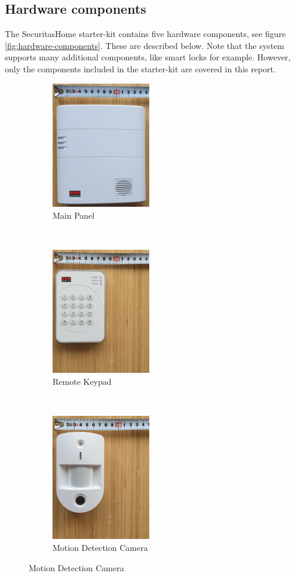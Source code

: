 \subsection{Hardware components} \label{ch:system:hardware}
The SecuritasHome starter-kit contains five hardware components, see figure \ref{fig:hardware-components}. These are described below. Note that the system supports many additional components, like smart locks for example. However, only the components included in the starter-kit are covered in this report.
\begin{figure}[!ht]
    \centering
    \begin{subfigure}[t]{0.33\textwidth}
        \includegraphics[height=2.15in]{images/main-panel.png}
        \caption{Main Panel}
        \label{fig:main-panel}
    \end{subfigure}%
    ~
    \begin{subfigure}[t]{0.33\textwidth}
        \includegraphics[height=2.15in]{images/keypad.png}
        \caption{Remote Keypad}
        \label{fig:remote-keypad}
    \end{subfigure}%
    ~
    \begin{subfigure}[t]{0.33\textwidth}
        \includegraphics[height=2.15in]{images/camera.png}
        \caption{Motion Detection Camera}
        \label{fig:motion-camera}
    \end{subfigure}
    

\end{figure}
